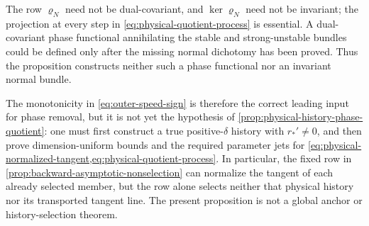 The row \(\varrho_N\) need not be dual-covariant, and
\(\ker\varrho_N\) need not be invariant; the projection at every step in
\cref{eq:physical-quotient-process} is essential.  A dual-covariant phase
functional annihilating the stable and strong-unstable bundles could be
defined only after the missing normal dichotomy has been proved.  Thus the
proposition constructs neither such a phase functional nor an invariant
normal bundle.

The monotonicity in \cref{eq:outer-speed-sign} is therefore the correct
leading input for phase removal, but it is not yet the hypothesis of
\cref{prop:physical-history-phase-quotient}: one must first construct a true
positive-\(\delta\) history with \(r_*'\ne0\), and then prove dimension-uniform
bounds and the required parameter jets for
\cref{eq:physical-normalized-tangent,eq:physical-quotient-process}.  In
particular, the fixed row in
\cref{prop:backward-asymptotic-nonselection} can normalize the tangent of
each already selected member, but the row alone selects neither that physical
history nor its transported tangent line.  The present proposition is not a
global anchor or history-selection theorem.

